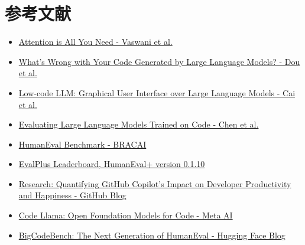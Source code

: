 \documentclass[11pt]{article}
\begin{document}
\section{参考文献}
\begin{itemize}
    \item \href{https://arxiv.org/abs/1706.03762}{Attention is All You Need - Vaswani et al.}
    \item \href{https://arxiv.org/abs/2407.06153}{What's Wrong with Your Code Generated by Large Language Models? - Dou et al.}
    \item \href{https://arxiv.org/abs/2304.08103}{Low-code LLM: Graphical User Interface over Large Language Models - Cai et al.}
    \item \href{https://arxiv.org/abs/2107.03374}{Evaluating Large Language Models Trained on Code - Chen et al.}
    \item \href{https://www.bracai.eu/post/humaneval-benchmark}{HumanEval Benchmark - BRACAI}
    \item \href{https://evalplus.github.io/leaderboard.html}{EvalPlus Leaderboard, HumanEval+ version 0.1.10}
    \item \href{https://github.blog/news-insights/research/research-quantifying-github-copilots-impact-on-developer-productivity-and-happiness/}{Research: Quantifying GitHub Copilot’s Impact on Developer Productivity and Happiness - GitHub Blog}
    \item \href{https://ai.meta.com/research/publications/code-llama-open-foundation-models-for-code/}{Code Llama: Open Foundation Models for Code - Meta AI}
    \item \href{https://huggingface.co/blog/leaderboard-bigcodebench}{BigCodeBench: The Next Generation of HumanEval - Hugging Face Blog}
\end{itemize}
\end{document}
